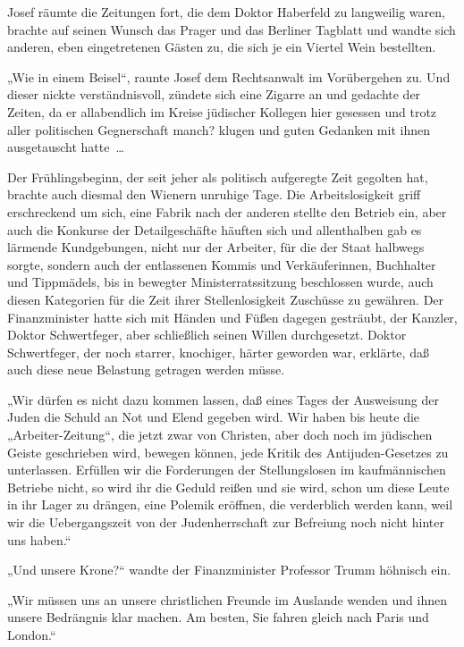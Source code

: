 Josef räumte die Zeitungen fort, die dem Doktor Haberfeld zu
langweilig waren, brachte auf seinen Wunsch das Prager und das
Berliner Tagblatt und wandte sich  anderen, eben
eingetretenen Gästen zu, die sich je ein Viertel Wein bestellten.

„Wie in einem Beisel“, raunte Josef dem Rechtsanwalt im
Vorübergehen zu. Und dieser nickte verständnisvoll, zündete sich
eine Zigarre an und gedachte der Zeiten, da er allabendlich im
Kreise jüdischer Kollegen hier gesessen und trotz aller politischen
Gegnerschaft manch? klugen und guten Gedanken mit ihnen
ausgetauscht hatte~\ldots{}

\tb{* * *}
Der Frühlingsbeginn, der seit jeher als politisch aufgeregte Zeit
gegolten hat, brachte auch diesmal den Wienern unruhige Tage. Die
Arbeitslosigkeit griff erschreckend um sich, eine Fabrik nach der
anderen stellte den Betrieb ein, aber auch die Konkurse der
Detailgeschäfte häuften sich und allenthalben gab es lärmende
Kundgebungen, nicht nur der Arbeiter, für die der Staat halbwegs
sorgte, sondern auch der entlassenen Kommis und Verkäuferinnen,
Buchhalter und Tippmädels, bis in bewegter Ministerratssitzung
beschlossen wurde, auch diesen Kategorien für die Zeit ihrer
Stellenlosigkeit Zuschüsse zu gewähren. Der Finanzminister hatte
sich mit Händen und Füßen dagegen gesträubt, der Kanzler, Doktor
Schwertfeger, aber schließlich seinen Willen durchgesetzt. Doktor
Schwertfeger, der noch starrer, knochiger, härter geworden war,
erklärte, daß auch diese neue Belastung getragen werden müsse.

„Wir dürfen es nicht dazu kommen lassen, daß eines Tages der
Ausweisung der Juden die Schuld an Not und  Elend
gegeben wird. Wir haben bis heute die „Arbeiter-Zeitung“, die jetzt
zwar von Christen, aber doch noch im jüdischen Geiste geschrieben
wird, bewegen können, jede Kritik des Antijuden-Gesetzes zu
unterlassen. Erfüllen wir die Forderungen der Stellungslosen im
kaufmännischen Betriebe nicht, so wird ihr die Geduld reißen und
sie wird, schon um diese Leute in ihr Lager zu drängen, eine
Polemik eröffnen, die verderblich werden kann, weil wir die
Uebergangszeit von der Judenherrschaft zur Befreiung noch nicht
hinter uns haben.“

„Und unsere Krone?“ wandte der Finanzminister Professor Trumm
höhnisch ein.

„Wir müssen uns an unsere christlichen Freunde im Auslande wenden
und ihnen unsere Bedrängnis klar machen. Am besten, Sie fahren
gleich nach Paris und London.“

